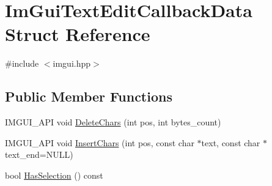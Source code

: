 \hypertarget{struct_im_gui_text_edit_callback_data}{}\section{Im\+Gui\+Text\+Edit\+Callback\+Data Struct Reference}
\label{struct_im_gui_text_edit_callback_data}


{\ttfamily \#include $<$imgui.\+hpp$>$}

\subsection*{Public Member Functions}
\begin{DoxyCompactItemize}
\item 
I\+M\+G\+U\+I\+\_\+\+A\+PI void \hyperlink{struct_im_gui_text_edit_callback_data_aaa702107677f7da0e7ea61311ab69af0}{Delete\+Chars} (int pos, int bytes\+\_\+count)
\item 
I\+M\+G\+U\+I\+\_\+\+A\+PI void \hyperlink{struct_im_gui_text_edit_callback_data_a78aa927e57bf5fb898ba5a168e9bcf63}{Insert\+Chars} (int pos, const char $\ast$text, const char $\ast$text\+\_\+end=N\+U\+LL)
\item 
bool \hyperlink{struct_im_gui_text_edit_callback_data_ac43cc964e6c1c829db3fdb71660ff604}{Has\+Selection} () const
\end{DoxyCompactItemize}
